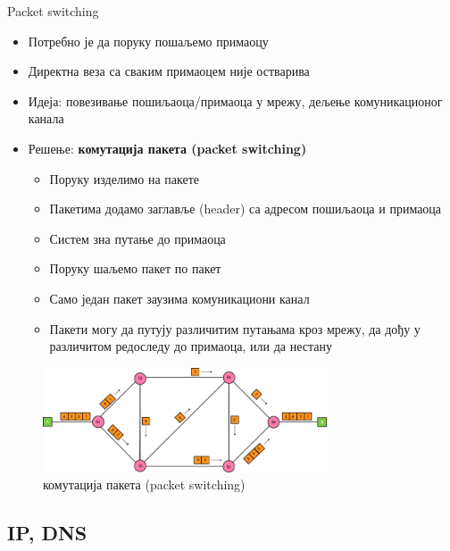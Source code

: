 \documentclass{beamer}
\begin{document}
    \begin{frame}[allowframebreaks]{Packet switching}
        \begin{itemize}
            \item Потребно је да поруку пошаљемо примаоцу
            \item Директна веза са сваким примаоцем није остварива
            \item Идеја: повезивање пошиљаоца/примаоца у мрежу, дељење комуникационог канала
            \item Решење: \textbf{комутација пакета (packet switching)}
            \begin{itemize}
                \item Поруку изделимо на пакете
                \item Пакетима додамо заглавље (header) са адресом пошиљаоца и примаоца
                \item Систем зна путање до примаоца
                \item Поруку шаљемо пакет по пакет
                \item Само један пакет заузима комуникациони канал
                \item Пакети могу да путују различитим путањама кроз мрежу, да дођу у различитом редоследу до примаоца, или да нестану
            \end{itemize}
        \end{itemize}

        \framebreak

        \begin{figure}
            \centering
            \includegraphics[width=0.75\textwidth]{images/pcsw.png}
            \caption{комутација пакета (packet switching)}
            \label{fig:pcsw}
        \end{figure}
    \end{frame}

    \subsection{IP, DNS}
\end{document}
